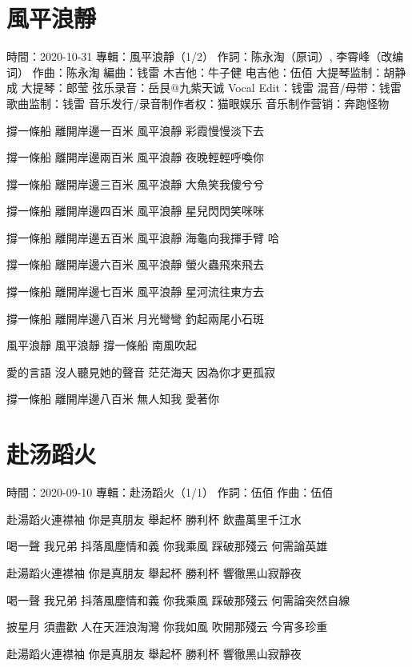 \documentclass[UTF8,a4paper,oneside,twocolumn,12pt]{ctexbook}
\newcommand{\infopair}[2]{\textbullet #1：#2}
\newcommand{\zc}[1][伍佰]{\infopair{作詞}{#1}}
\newcommand{\zq}[1][伍佰]{\infopair{作曲}{#1}}
\newcommand{\bq}[1][伍佰]{\infopair{編曲}{#1}}
\newcommand{\zj}[1]{\infopair{專輯}{#1}}
\newcommand{\sj}[1]{\infopair{時間}{#1}}
\newenvironment{info}{\begin{flushleft}\kaishu
	}
	{\end{flushleft}\normalsize\yahei\par}
\newenvironment{lyric}{
	}
{}
\begin{document}
\section{風平浪靜}
\begin{info}
	\sj{2020-10-31}
	\zj{風平浪靜（1/2）}
	\zc[陈永淘（原词）, 李霄峰（改编词）]
	\zq[陈永淘]
	\bq[钱雷]
	\infopair{木吉他}{牛子健}
	\infopair{电吉他}{伍佰}
	\infopair{大提琴监制}{胡静成}
	\infopair{大提琴}{郎莹}
	\infopair{弦乐录音}{岳艮@九紫天诚}
	\infopair{Vocal Edit}{钱雷}
	\infopair{混音/母带}{钱雷}
	\infopair{歌曲监制}{钱雷}
	\infopair{音乐发行/录音制作者权}{猫眼娱乐}
	\infopair{音乐制作营销}{奔跑怪物}
\end{info}
\begin{lyric}
	撐一條船 離開岸邊一百米
	風平浪靜 彩霞慢慢淡下去

	撐一條船 離開岸邊兩百米
	風平浪靜 夜晚輕輕呼喚你

	撐一條船 離開岸邊三百米
	風平浪靜 大魚笑我傻兮兮

	撐一條船 離開岸邊四百米
	風平浪靜 星兒閃閃笑咪咪

	撐一條船 離開岸邊五百米
	風平浪靜 海龜向我揮手臂 哈

	撐一條船 離開岸邊六百米
	風平浪靜 螢火蟲飛來飛去

	撐一條船 離開岸邊七百米
	風平浪靜 星河流往東方去

	撐一條船 離開岸邊八百米
	月光彎彎 釣起兩尾小石斑

	風平浪靜 風平浪靜
	撐一條船 南風吹起

	愛的言語 沒人聽見她的聲音
	茫茫海天 因為你才更孤寂

	撐一條船 離開岸邊八百米
	無人知我 愛著你
\end{lyric}

\section{赴汤蹈火}
\begin{info}
	\sj{2020-09-10}
	\zj{赴汤蹈火（1/1）}
	\zc
	\zq
\end{info}
\begin{lyric}
	赴湯蹈火連襟袖
	你是真朋友
	舉起杯 勝利杯
	飲盡萬里千江水

	喝一聲 我兄弟
	抖落風塵情和義
	你我乘風
	踩破那殘云
	何需論英雄

	赴湯蹈火連襟袖
	你是真朋友
	舉起杯 勝利杯
	響徹黑山寂靜夜

	喝一聲 我兄弟
	抖落風塵情和義
	你我乘風
	踩破那殘云
	何需論突然自線

	披星月 須盡歡
	人在天涯浪淘灣
	你我如風
	吹開那殘云
	今宵多珍重

	赴湯蹈火連襟袖
	你是真朋友
	舉起杯 勝利杯
	響徹黑山寂靜夜
\end{lyric}
\end{document}
